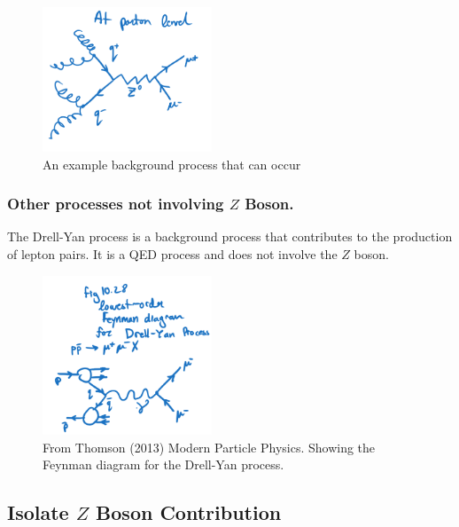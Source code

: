 \begin{figure}[H]
    \centering
    \includegraphics[width=0.45\textwidth]{AnalyzingColliderEvents/figures/examplebackground.png}
    \caption{An example background process that can occur}
\end{figure}

\subsubsection{Other processes not involving $Z$ Boson.}
The Drell-Yan process is a background process that contributes to the production of lepton pairs. It is a QED process and does not involve the $Z$ boson.

\begin{figure}[H]
    \centering
    \includegraphics[width=0.45\textwidth]{AnalyzingColliderEvents/figures/drellyan.png}
    \caption{From \cite{thomson} Thomson (2013)  Modern Particle Physics. Showing the Feynman diagram for the Drell-Yan process.}
\end{figure}

\subsection{Isolate $Z$ Boson Contribution}


